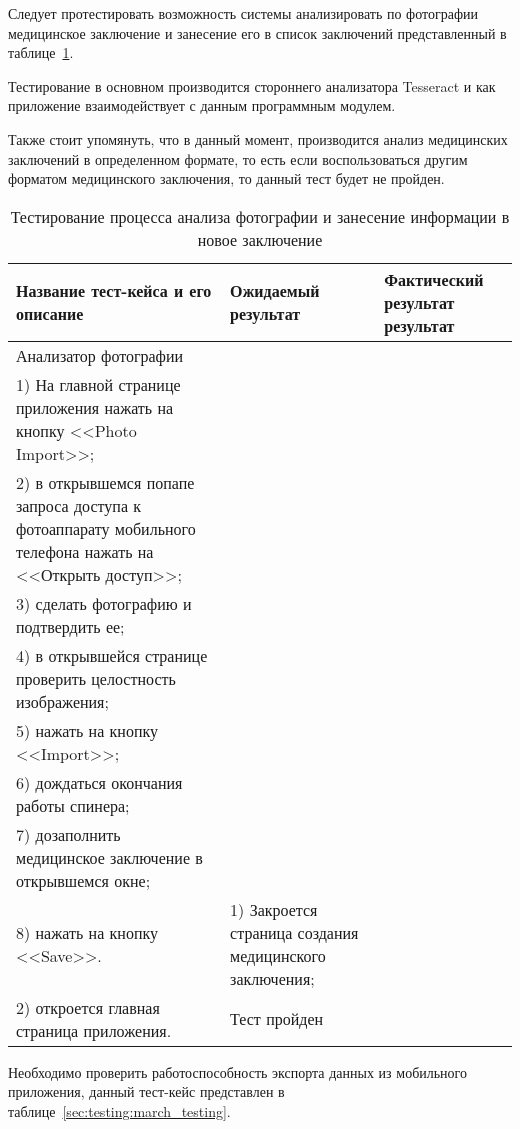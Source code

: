 Следует протестировать возможность системы анализировать по фотографии медицинское заключение и занесение его в список заключений представленный в таблице~\ref{sec:testing:regeneration}. 

Тестирование в основном производится стороннего анализатора Tesseract и как приложение взаимодействует с данным программным модулем. 

Также стоит упомянуть, что в данный момент, производится анализ медицинских заключений в определенном формате, то есть если воспользоваться другим форматом медицинского заключения, то данный тест будет не пройден.

\pagebreak

\begin{longtable}[p]{| >{\raggedright}p{}                     
                     | >{\raggedright}p{}
                     | >{\raggedright\arraybackslash}p{}|}
  \caption{Тестирование процесса анализа фотографии и занесение информации в новое заключение}
  \label{sec:testing:regeneration} \tabularnewline

  \hline
      Название тест-кейса и его описание & Ожидаемый результат & Фактический результат результат \\
   \hline
   Анализатор фотографии\\ 
   1) На главной странице приложения нажать на кнопку <<Photo Import>>; \\
   2) в открывшемся попапе запроса доступа к фотоаппарату мобильного телефона нажать на <<Открыть доступ>>; \\
   3) сделать фотографию и подтвердить ее; \\
   4) в открывшейся странице проверить целостность изображения; \\
   5) нажать на кнопку <<Import>>; \\
   6) дождаться окончания работы спинера; \\
   7) дозаполнить медицинское заключение в открывшемся окне; \\
   8) нажать на кнопку <<Save>>.

   &
   1) Закроется страница создания медицинского заключения;\\
   2) откроется главная страница приложения.

   &
   Тест пройден \\
   \hline
\end{longtable}

Необходимо проверить работоспособность экспорта данных из мобильного приложения, данный тест-кейс представлен в таблице~\ref{sec:testing:march_testing}.

